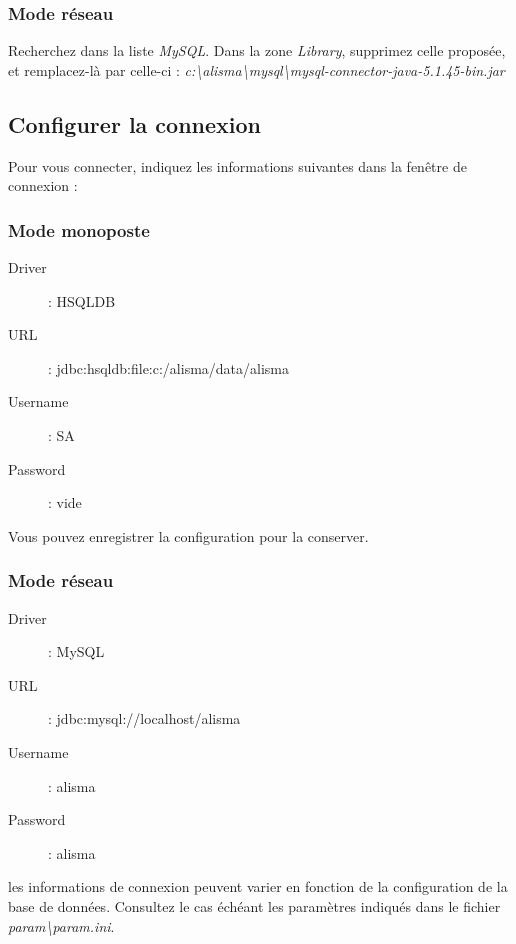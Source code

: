 \subsubsection{Mode réseau}

Recherchez dans la liste \textit{MySQL}. Dans la zone \textit{Library}, supprimez celle proposée, et remplacez-là par celle-ci : \textit{\NoAutoSpaceBeforeFDP c:\textbackslash{}alisma\textbackslash{}mysql\textbackslash{}mysql-connector-java-5.1.45-bin.jar}

\subsection{Configurer la connexion}

Pour vous connecter, indiquez les informations suivantes dans la fenêtre de connexion :
\subsubsection{Mode monoposte}
\begin{description}
\item [Driver] : HSQLDB
\item [URL] : {\NoAutoSpaceBeforeFDP jdbc:hsqldb:file:c:/alisma/data/alisma}
\item [Username] : SA
\item [Password] : vide
\end{description}

Vous pouvez enregistrer la configuration pour la conserver.

\subsubsection{Mode réseau}

\begin{description}
\item [Driver] : MySQL
\item [URL] : {\NoAutoSpaceBeforeFDP jdbc:mysql://localhost/alisma}
\item [Username] : alisma
\item [Password] : alisma
\end{description}

les informations de connexion peuvent varier en fonction de la configuration de la base de données. Consultez le cas échéant les paramètres indiqués dans le fichier \textit{param\textbackslash{}param.ini}.


%